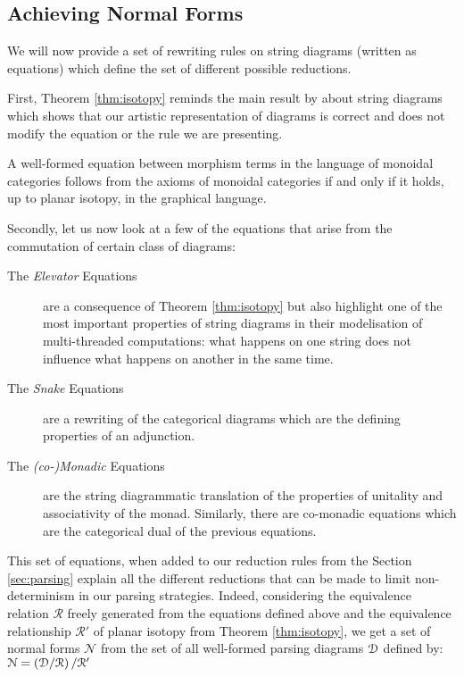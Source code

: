 \subsection{Achieving Normal Forms}
\label{subsec:normalforms}
We will now provide a set of rewriting rules on string diagrams (written as
equations) which define the set of different possible reductions.

First, Theorem \ref{thm:isotopy} reminds the main result by \cite{joyalGeometryTensorCalculus1991} about string diagrams which shows that our artistic representation of diagrams is correct and does not modify the equation or the rule we are presenting.
\begin{theorem}
	\label{thm:isotopy}
	A well-formed equation between morphism terms in the language of monoidal categories follows from the axioms of monoidal categories if and only if it holds, up to planar isotopy, in the graphical language.
\end{theorem}

Secondly, let us now look at a few of the equations that arise from the
commutation of certain class of diagrams:
\begin{description}
	\item[The \emph{Elevator} Equations] are a consequence of Theorem
	      \ref{thm:isotopy} but also highlight one of the most important properties
	      of string diagrams in their modelisation of multi-threaded computations:
	      what happens on one string does not influence what happens on another in
	      the same time.
	\item[The \emph{Snake} Equations] are a rewriting of the categorical diagrams
	      which are the defining properties of an adjunction.
	\item[The \emph{(co-)Monadic} Equations] are the string diagrammatic
	      translation of the properties of unitality and associativity of the
	      monad.
	      Similarly, there are co-monadic equations which are the categorical dual
	      of the previous equations.
\end{description}
This set of equations, when added to our reduction rules from the Section
\ref{sec:parsing} explain all the different reductions that can be made to
limit non-determinism in our parsing strategies.
Indeed, considering the equivalence relation $\mathcal{R}$ freely generated
from the equations defined above and the equivalence relationship
$\mathcal{R}'$ of planar isotopy from Theorem \ref{thm:isotopy}, we get a set
of normal forms $\mathcal{N}$ from the set of all well-formed parsing diagrams
$\mathcal{D}$ defined by:
$\mathcal{N} = \left( \mathcal{D} / \mathcal{R} \right) / \mathcal{R}'$


